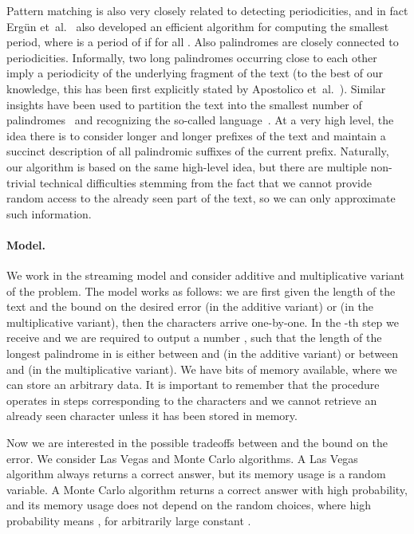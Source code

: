 \documentclass{article}[11pt,letter]
\newcommand{\etal}{et~al.}
\begin{document}
Pattern matching is also very closely related to detecting periodicities, and in fact Erg{\"u}n \etal~\cite{ErgunPeriodicity} also developed
an efficient algorithm for computing the smallest period, where  is a period of  if  for all . Also palindromes are closely connected to periodicities. Informally, two long
palindromes occurring close to each other imply a periodicity of the underlying fragment of the text
(to the best of our knowledge, this has been first explicitly stated by Apostolico \etal~\cite{Apostolico}).
Similar insights have been used to partition the text into the smallest number of palindromes~\cite{FiciGKK14,ISIBT14}
and recognizing the so-called  language~\cite{KosolobovRS15}.
At a very high level, the idea there is to consider longer and longer prefixes of the text and maintain a succinct description
of all palindromic suffixes of the current prefix. Naturally, our algorithm is based on the same high-level idea, but there
are multiple non-trivial technical difficulties stemming from the fact that we cannot provide random access to the already
seen part of the text, so we can only approximate such information.

\paragraph{Model.} We work in the streaming model and consider additive and multiplicative variant of the problem.
The model works as follows: we are first given the length of the text  and the bound on the desired error
 (in the additive variant) or  (in the multiplicative variant), then the characters
 arrive one-by-one. In the -th step we receive  and we are required to output a number , such that the length of the longest palindrome in
 is either between  and  (in the additive variant) or between  and 
(in the multiplicative variant). 
We have  bits of memory available, where we can store an arbitrary data.
It is important to remember that the procedure operates in steps corresponding
to the characters and we cannot retrieve an already seen character unless it has been stored in memory.

Now we are interested in the possible tradeoffs between  and the bound on the error.
We consider Las Vegas and Monte Carlo algorithms.
A Las Vegas algorithm always returns a correct answer, but its memory usage  is a random variable.
A Monte Carlo algorithm returns a correct answer with high probability, and its memory usage 
does not depend on the random choices, where high probability means , for arbitrarily large constant .
\end{document}
